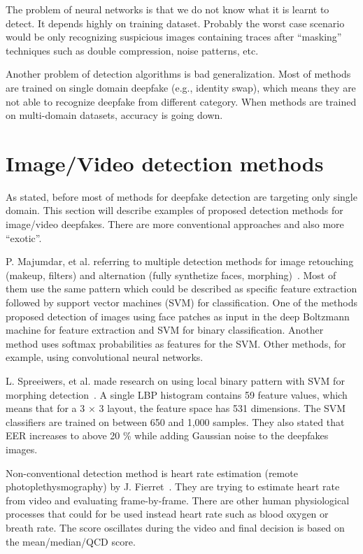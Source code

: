 The problem of neural networks is that we do not know what it is learnt to detect. It depends highly on training dataset. Probably the worst case scenario would be only recognizing suspicious images containing traces after “masking” techniques such as double compression, noise patterns, etc.

Another problem of detection algorithms is bad generalization. Most of methods are trained on single domain deepfake (e.g., identity swap), which means they are not able to recognize deepfake from different category. When methods are trained on multi-domain datasets, accuracy is going down.~\cite{FacialRetouchingAndAlterationDetection}

\section{Image/Video detection methods}

As stated, before most of methods for deepfake detection are targeting only single domain. This section will describe examples of proposed detection methods for image/video deepfakes. There are more conventional approaches and also more “exotic”.

P. Majumdar, et al. referring to multiple detection methods for image retouching (makeup, filters) and alternation (fully synthetize faces, morphing)~\cite{FacialRetouchingAndAlterationDetection}. Most of them use the same pattern which could be described as specific feature extraction followed by support vector machines (SVM) for classification. One of the methods proposed detection of images using face patches as input in the deep Boltzmann machine for feature extraction and SVM for binary classification. Another method uses softmax probabilities as features for the SVM. Other methods, for example, using convolutional neural networks.~\cite{FacialRetouchingAndAlterationDetection}

L. Spreeiwers, et al. made research on using local binary pattern with SVM for morphing detection~\cite{PracticalEvaluationOfFaceMorphingAttackDetectionMethods}. A single LBP histogram contains 59 feature values, which means that for a 3 × 3 layout, the feature space has 531 dimensions. The SVM classifiers are trained on between 650 and 1,000 samples. They also stated that EER increases to above 20 \% while adding Gaussian noise to the deepfakes images.

Non-conventional detection method is heart rate estimation (remote photoplethysmography) by J. Fierret~\cite{DetectionBasedOnHeartRateEstimation}. They are trying to estimate heart rate from video and evaluating frame-by-frame. There are other human physiological processes that could for be used instead heart rate such as blood oxygen or breath rate. The score oscillates during the video and final decision is based on the mean/median/QCD score.

